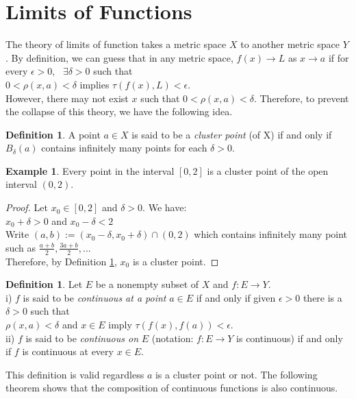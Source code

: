 \documentclass[12pt, reqno]{amsart}
\theoremstyle{definition}
\newtheorem{definition}[theorem]{Definition}
\newtheorem{example}[theorem]{Example}
\numberwithin{equation}{section}
\newcommand{\tab}{\hspace{1cm}}
\begin{document}
\section{Limits of Functions}
The theory of limits of function takes a metric space $X$ to another metric space $Y$. By definition, we can guess that in any metric space, $f(x) \rightarrow L$ as $x \rightarrow a$ if for every ${\epsilon>0, \text{ } \exists \delta>0}$ such that\\
\hspace*{4cm} $0<\rho(x,a)<\delta$ implies $\tau(f(x),L)<\epsilon$.\\
However, there may not exist $x$ such that $0<\rho(x,a)<\delta$. Therefore, to prevent the collapse of this theory, we have the following idea.
\begin{definition}\cite{s1}
    A point $a \in X$ is said to be a \textit{cluster point} (of X) if and only if $B_\delta(a)$ contains infinitely many points for each $\delta >0$. \label{cluster}
\end{definition}
\begin{example}
     Every point in the interval $[0,2]$ is a cluster point of the open interval $(0,2)$.
\end{example}
\begin{proof}
    Let $x_0 \in [0,2]$ and $\delta >0$. We have:\\
    \tab $x_0 + \delta >0$ and $x_0 - \delta <2$\\
    Write $(a,b) := (x_0 - \delta, x_0 + \delta) \cap (0,2)$ which contains infinitely many point such as $\frac{a+b}{2}, \frac{3a+b}{2},...$\\
    Therefore, by Definition \ref{cluster}, $x_0$ is a cluster point.
\end{proof}
\begin{definition}\cite{s1}
    Let $E$ be a nonempty subset of $X$ and $f : E \rightarrow Y$.\\
    i) $f$ is said to be \textit{continuous at a point} $a \in E$ if and only if given $\epsilon>0$ there is a $\delta > 0$ such that\\
    \hspace*{4cm}$\rho(x,a) < \delta$ and $x \in E$ imply $\tau(f(x), f(a)) <\epsilon$.\\
    ii) $f$ is said to be \textit{continuous on} $E$ (notation: $f : E \rightarrow Y$ is continuous) if and only if $f$ is continuous at every $x \in E$.
\end{definition}
This definition is valid regardless $a$ is a cluster point or not. The following theorem shows that the composition of continuous functions is also continuous.
\end{document}
